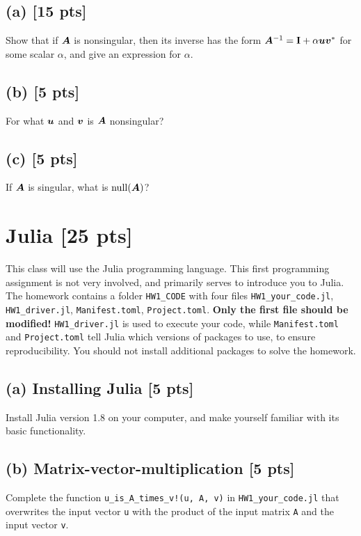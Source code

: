 \documentclass[twoside,10pt]{article}
\begin{document}
\subsection*{(a) [15 pts]}
Show that if $\bm{A}$ is nonsingular, then its inverse has the form $\bm{A}^{-1} = \mathbf{I} + \alpha \bm{u}\bm{v}^{*}$ for some scalar $\alpha$, and give an expression for $\alpha$.

\subsection*{(b) [5 pts]}
For what $\bm{u}$ and $\bm{v}$ is $\bm{A}$ nonsingular? 

\subsection*{(c) [5 pts]} 
If $\bm{A}$ is singular, what is $\operatorname{null}(\bm{A})$?

\section{Julia [25 pts]}

This class will use the Julia programming language. 
This first programming assignment is not very involved, and primarily serves to introduce you to Julia. 
The homework contains a folder \texttt{HW1\_CODE} with four files \texttt{HW1\_your\_code.jl}, \texttt{HW1\_driver.jl}, \texttt{Manifest.toml}, \texttt{Project.toml}. 
\textbf{Only the first file should be modified!} \texttt{HW1\_driver.jl} is used to execute your code, while \texttt{Manifest.toml} and \texttt{Project.toml} tell Julia which versions of packages to use, to ensure reproducibility. 
You should not install additional packages to solve the homework.

\subsection*{(a) Installing Julia [5 pts]} 
Install Julia version 1.8 on your computer, and make yourself familiar with its basic functionality. 

\subsection*{(b) Matrix-vector-multiplication [5 pts]} 
Complete the function \texttt{u\_is\_A\_times\_v!(u, A, v)} in \texttt{HW1\_your\_code.jl} that overwrites the input vector \texttt{u} with the product of the input matrix \texttt{A} and the input vector \texttt{v}.
\end{document}
